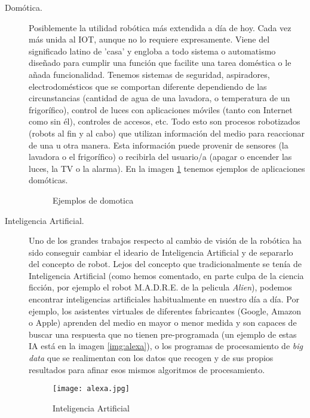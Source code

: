 \begin{description}
	\item [Domótica.] Posiblemente la utilidad robótica más extendida a día de hoy. Cada vez más unida al IOT, aunque no lo requiere expresamente. Viene del significado latino de 'casa' y engloba a todo sistema o automatismo diseñado para cumplir una función que facilite una tarea doméstica o le añada funcionalidad. Tenemos sistemas de seguridad, aspiradores, electrodomésticos que se comportan diferente dependiendo de las circunstancias (cantidad de agua de una lavadora, o temperatura de un frigorífico), control de luces con aplicaciones móviles (tanto con Internet como sin él), controles de accesos, etc. Todo esto son procesos robotizados (robots al fin y al cabo) que utilizan información del medio para reaccionar de una u otra manera. Esta información puede provenir de sensores (la lavadora o el frigorífico) o recibirla del usuario/a (apagar o encender las luces, la TV o la alarma). En la imagen \ref{img:domotica} tenemos ejemplos de aplicaciones domóticas.
	\begin{figure}[h]
		\centering
		\begin{subfigure}
			[Robot aspirador] {
				\texttt{[image: domotica1.jpg]}
				\label{img:domo1}}
		\end{subfigure}
		\begin{subfigure}
			[Elementos para control inteligente de luces] {
				\texttt{[image: domotica2.jpg]}
				\label{img:domo2}}
		\end{subfigure}
		\caption{Ejemplos de domotica}
		\label{img:domotica}
	\end{figure}
	\item [Inteligencia Artificial.] Uno de los grandes trabajos respecto al cambio de visión de la robótica ha sido conseguir cambiar el ideario de Inteligencia Artificial y de separarlo del concepto de robot. Lejos del concepto que tradicionalmente se tenía de Inteligencia Artificial (como hemos comentado, en parte culpa de la ciencia ficción, por ejemplo el robot M.A.D.R.E. de la pelicula \textit{Alien}), podemos encontrar inteligencias artificiales habitualmente en nuestro día a día. Por ejemplo, los asistentes virtuales de diferentes fabricantes (Google, Amazon o Apple) aprenden del medio en mayor o menor medida y son capaces de buscar una respuesta que no tienen pre-programada (un ejemplo de estas IA está en la imagen \ref{img:alexa}), o los programas de procesamiento de \textit{big data} que se realimentan con los datos que recogen y de sus propios resultados para afinar esos mismos algoritmos de procesamiento.
	\begin{figure}[h]
		\centering
		\texttt{[image: alexa.jpg]}
		\caption{Inteligencia Artificial}
		\label{ima:alexa}
	\end{figure}
	

\end{description}
